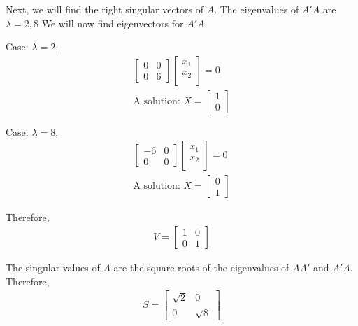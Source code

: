 Next, we will find the right singular vectors of \(A\).
The eigenvalues of \(A'A\) are \(\lambda = 2,8\)
We will now find eigenvectors for \(A'A\).

Case: \(\lambda = 2\),
\begin{eqnarray}
  \begin{bmatrix}
    0 & 0 \\
    0 & 6
  \end{bmatrix}
  \begin{bmatrix}
    x_1 \\
    x_2 \\
  \end{bmatrix}
  = 0 \\
  \text{A solution: }
  X = 
  \begin{bmatrix}
    1 \\
    0
  \end{bmatrix}
\end{eqnarray}

Case: \(\lambda = 8 \),
\begin{eqnarray}
  \begin{bmatrix}
    -6 & 0 \\
    0 & 0
  \end{bmatrix}
  \begin{bmatrix}
    x_1 \\
    x_2 \\
  \end{bmatrix}
  = 0 \\
  \text{A solution: }
  X =
  \begin{bmatrix}
    0 \\
    1
  \end{bmatrix}
\end{eqnarray}

Therefore,
\begin{eqnarray}
  V = 
  \begin{bmatrix}
    1 & 0 \\
    0 & 1
  \end{bmatrix}
\end{eqnarray}

The singular values of \(A\) are the square roots of the eigenvalues of \(AA'\) and \(A'A\).
Therefore,
\begin{eqnarray}
  S = 
  \begin{bmatrix}
    \sqrt{2} & 0 \\
    0 & \sqrt{8}
  \end{bmatrix}
\end{eqnarray}

